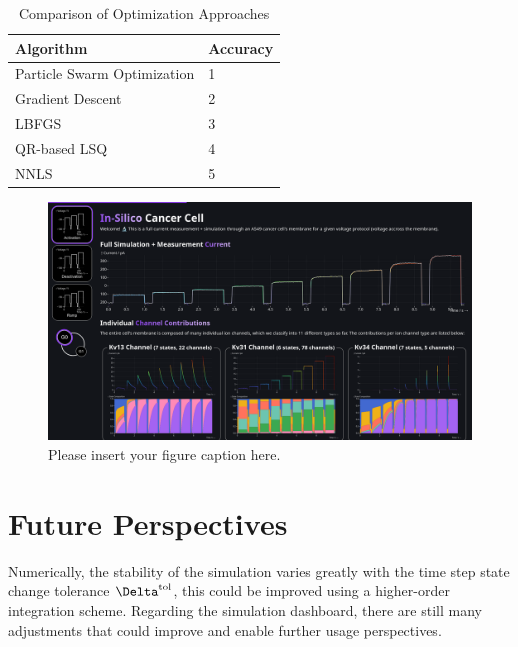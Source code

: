 \documentclass[USenglish,twocolumn]{article}
\begin{document}
  \begin{table}
    \caption{Comparison of Optimization Approaches}
    \begin{tabular}{ll}
      \textbf{Algorithm}          & \textbf{Accuracy} \\
      \midrule
      Particle Swarm Optimization & 1                 \\
      Gradient Descent            & 2                 \\
      LBFGS                       & 3                 \\
      QR-based LSQ                & 4                 \\
      NNLS                        & 5                 \\
    \end{tabular}
    \label{table:optimization-comparison}
  \end{table}

  \begin{figure}
    \includegraphics[width=\textwidth]{../figures/above-the-fold-screenshot.png}
    \caption{Please insert your figure caption here.}
    \label{figure:screenshot}
  \end{figure}

  \section{Future Perspectives}
  Numerically, the stability of the simulation varies greatly with the time step state change tolerance $\Delta^{\rm tol}$, this could be improved using a higher-order integration scheme.
  Regarding the simulation dashboard, there are still many adjustments that could improve and enable further usage perspectives.

  \vspace{1cm}
\end{document}
